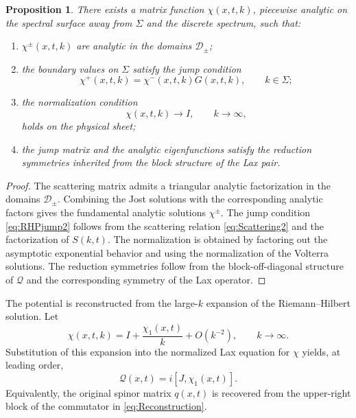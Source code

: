 \documentclass[11pt]{amsart}
\newtheorem{proposition}{Proposition}[section]
\theoremstyle{definition}
\numberwithin{equation}{section}
\begin{document}
\begin{proposition}
There exists a matrix function $\chi(x,t,k)$, piecewise analytic on the spectral surface away from $\Sigma$ and the discrete spectrum, such that:

\begin{enumerate}
\item $\chi^\pm(x,t,k)$ are analytic in the domains $\mathcal D_\pm$;

\item the boundary values on $\Sigma$ satisfy the jump condition
\begin{equation}
\chi^+(x,t,k)
=
\chi^-(x,t,k)G(x,t,k),
\qquad k\in\Sigma;
\label{eq:RHPjump2}
\end{equation}

\item the normalization condition
\begin{equation}
\chi(x,t,k)\to I,
\qquad k\to\infty,
\label{eq:Normalization}
\end{equation}
holds on the physical sheet;

\item the jump matrix and the analytic eigenfunctions satisfy the reduction symmetries inherited from the block structure of the Lax pair.
\end{enumerate}
\end{proposition}

\begin{proof}
The scattering matrix admits a triangular analytic factorization in the domains $\mathcal D_\pm$. Combining the Jost solutions with the corresponding analytic factors gives the fundamental analytic solutions $\chi^\pm$. The jump condition \eqref{eq:RHPjump2} follows from the scattering relation \eqref{eq:Scattering2} and the factorization of $S(k,t)$. The normalization is obtained by factoring out the asymptotic exponential behavior and using the normalization of the Volterra solutions. The reduction symmetries follow from the block-off-diagonal structure of $\mathcal Q$ and the corresponding symmetry of the Lax operator.
\end{proof}

The potential is reconstructed from the large-$k$ expansion of the Riemann--Hilbert solution. Let
\begin{equation}
\chi(x,t,k)
=
I+\frac{\chi_1(x,t)}{k}+O(k^{-2}),
\qquad k\to\infty .
\label{eq:chiExpansion}
\end{equation}
Substitution of this expansion into the normalized Lax equation for $\chi$ yields, at leading order,
\begin{equation}
\mathcal Q(x,t)
=
i[J,\chi_1(x,t)] .
\label{eq:Reconstruction}
\end{equation}
Equivalently, the original spinor matrix $q(x,t)$ is recovered from the upper-right block of the commutator in \eqref{eq:Reconstruction}.
\end{document}
